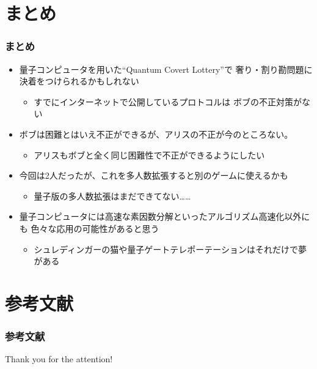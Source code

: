 \section{まとめ}

\begin{frame}
  \frametitle{まとめ}

  \pause
  \begin{itemize}
    \item<+-> 量子コンピュータを用いた``Quantum Covert Lottery''で
    奢り・割り勘問題に決着をつけられるかもしれない
    \begin{itemize} 
      \item すでにインターネットで公開しているプロトコル\cite{quantum_covert_lottery}は
      ボブの不正対策がない
    \end{itemize}

    \item<+-> ボブは困難とはいえ不正ができるが、アリスの不正が今のところない。
    \begin{itemize} 
      \item アリスもボブと全く同じ困難性で不正ができるようにしたい
    \end{itemize}

    \item<+-> 今回は2人だったが、これを多人数拡張すると別のゲームに使えるかも
    \begin{itemize}
      \item 量子版の多人数拡張はまだできてない……
    \end{itemize}

    \item<+-> 量子コンピュータには高速な素因数分解といったアルゴリズム高速化以外にも
    色々な応用の可能性があると思う
    \begin{itemize}
      \item シュレディンガーの猫や量子ゲートテレポーテーションはそれだけで夢がある
    \end{itemize}
  \end{itemize}
\end{frame}

\section*{参考文献}
\begin{frame}[allowframebreaks]
  \frametitle{参考文献}
  \nocite{*}
  
  
\end{frame}

\begin{frame}
  \centering
  {\Huge Thank you for the attention!}
\end{frame}



